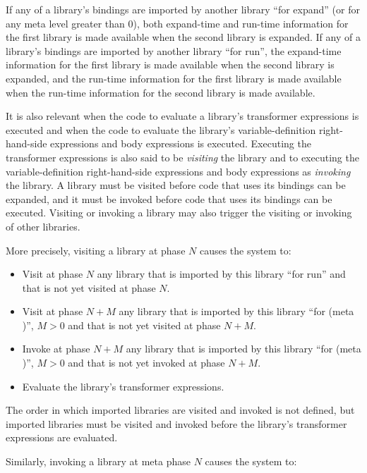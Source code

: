 If any of a library's bindings are imported by another library ``for
{\cf expand}'' (or for any meta level greater than 0), both expand-time and
run-time information for the first library is made available when the second
library is expanded.
If any of a library's bindings are imported by another library ``for
{\cf run}'', the expand-time information for the first library is made available when
the second library is expanded, and the run-time information for the first
library is made available when the run-time information for the second library
is made available.

It is also relevant when the code to evaluate a library's transformer
expressions is executed and when the code to evaluate the library's
variable-definition right-hand-side expressions and body expressions is
executed.
Executing the transformer expressions is also said to be \emph{visiting}
the library and to executing the variable-definition right-hand-side 
expressions and body expressions as \emph{invoking} the library.
A library must be visited before code that uses its bindings can be
expanded, and it must be invoked before code that uses its bindings can be
executed.
Visiting or invoking a library may also trigger the visiting or
invoking of other libraries.

More precisely, visiting a library at phase $N$ causes the system to:

\begin{itemize}
\item Visit at phase $N$ any library that is imported by this library
      ``for {\cf run}'' and that is not yet visited at phase $N$.
\item Visit at phase $N+M$ any library that is imported by this
      library ``for {\cf (meta )}'', $M>0$ and that is not yet
      visited at phase $N+M$.
\item Invoke at phase $N+M$ any library that is imported by this
      library ``for {\cf (meta )}'', $M>0$ and that is not yet
      invoked at phase $N+M$.
\item Evaluate the library's transformer expressions.
\end{itemize}

The order in which imported libraries are visited and invoked is not
defined, but imported libraries must be visited and invoked before the
library's transformer expressions are evaluated.

Similarly, invoking a library at meta phase $N$ causes the system to:

